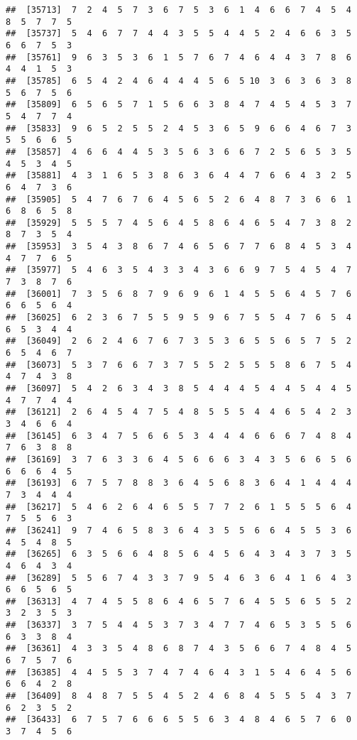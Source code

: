 \documentclass[
]{book}
\begin{document}
\begin{verbatim}
##  [35713]  7  2  4  5  7  3  6  7  5  3  6  1  4  6  6  7  4  5  4  8  5  7  7  5
##  [35737]  5  4  6  7  7  4  4  3  5  5  4  4  5  2  4  6  6  3  5  6  6  7  5  3
##  [35761]  9  6  3  5  3  6  1  5  7  6  7  4  6  4  4  3  7  8  6  4  4  1  5  3
##  [35785]  6  5  4  2  4  6  4  4  4  5  6  5 10  3  6  3  6  3  8  5  6  7  5  6
##  [35809]  6  5  6  5  7  1  5  6  6  3  8  4  7  4  5  4  5  3  7  5  4  7  7  4
##  [35833]  9  6  5  2  5  5  2  4  5  3  6  5  9  6  6  4  6  7  3  5  5  6  6  5
##  [35857]  4  6  6  4  4  5  3  5  6  3  6  6  7  2  5  6  5  3  5  4  5  3  4  5
##  [35881]  4  3  1  6  5  3  8  6  3  6  4  4  7  6  6  4  3  2  5  6  4  7  3  6
##  [35905]  5  4  7  6  7  6  4  5  6  5  2  6  4  8  7  3  6  6  1  6  8  6  5  8
##  [35929]  5  5  5  7  4  5  6  4  5  8  6  4  6  5  4  7  3  8  2  8  7  3  5  4
##  [35953]  3  5  4  3  8  6  7  4  6  5  6  7  7  6  8  4  5  3  4  4  7  7  6  5
##  [35977]  5  4  6  3  5  4  3  3  4  3  6  6  9  7  5  4  5  4  7  7  3  8  7  6
##  [36001]  7  3  5  6  8  7  9  6  9  6  1  4  5  5  6  4  5  7  6  6  6  5  6  4
##  [36025]  6  2  3  6  7  5  5  9  5  9  6  7  5  5  4  7  6  5  4  6  5  3  4  4
##  [36049]  2  6  2  4  6  7  6  7  3  5  3  6  5  5  6  5  7  5  2  6  5  4  6  7
##  [36073]  5  3  7  6  6  7  3  7  5  5  2  5  5  5  8  6  7  5  4  4  7  4  3  8
##  [36097]  5  4  2  6  3  4  3  8  5  4  4  4  5  4  4  5  4  4  5  4  7  7  4  4
##  [36121]  2  6  4  5  4  7  5  4  8  5  5  5  4  4  6  5  4  2  3  3  4  6  6  4
##  [36145]  6  3  4  7  5  6  6  5  3  4  4  4  6  6  6  7  4  8  4  7  6  3  8  8
##  [36169]  3  7  6  3  3  6  4  5  6  6  6  3  4  3  5  6  6  5  6  6  6  6  4  5
##  [36193]  6  7  5  7  8  8  3  6  4  5  6  8  3  6  4  1  4  4  4  7  3  4  4  4
##  [36217]  5  4  6  2  6  4  6  5  5  7  7  2  6  1  5  5  5  6  4  7  5  5  6  3
##  [36241]  9  7  4  6  5  8  3  6  4  3  5  5  6  6  4  5  5  3  6  4  5  4  8  5
##  [36265]  6  3  5  6  6  4  8  5  6  4  5  6  4  3  4  3  7  3  5  4  6  4  3  4
##  [36289]  5  5  6  7  4  3  3  7  9  5  4  6  3  6  4  1  6  4  3  6  6  5  6  5
##  [36313]  4  7  4  5  5  8  6  4  6  5  7  6  4  5  5  6  5  5  2  3  2  3  5  3
##  [36337]  3  7  5  4  4  5  3  7  3  4  7  7  4  6  5  3  5  5  6  6  3  3  8  4
##  [36361]  4  3  3  5  4  8  6  8  7  4  3  5  6  6  7  4  8  4  5  6  7  5  7  6
##  [36385]  4  4  5  5  3  7  4  7  4  6  4  3  1  5  4  6  4  5  6  6  6  4  2  8
##  [36409]  8  4  8  7  5  5  4  5  2  4  6  8  4  5  5  5  4  3  7  6  2  3  5  2
##  [36433]  6  7  5  7  6  6  6  5  5  6  3  4  8  4  6  5  7  6  0  3  7  4  5  6

\end{verbatim}
\end{document}
